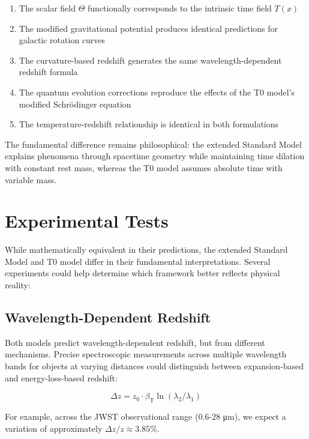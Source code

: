 \documentclass[aps,prl,twocolumn,superscriptaddress,nofootinbib]{revtex4-2}
\newcommand{\Tfield}{T(x)}
\newcommand{\betaT}{\beta_{\text{T}}}
\begin{document}
	\begin{enumerate}
		\item The scalar field $\Theta$ functionally corresponds to the intrinsic time field $\Tfield$
		\item The modified gravitational potential produces identical predictions for galactic rotation curves
		\item The curvature-based redshift generates the same wavelength-dependent redshift formula
		\item The quantum evolution corrections reproduce the effects of the T0 model's modified Schrödinger equation
		\item The temperature-redshift relationship is identical in both formulations
	\end{enumerate}
	
	The fundamental difference remains philosophical: the extended Standard Model explains phenomena through spacetime geometry while maintaining time dilation with constant rest mass, whereas the T0 model assumes absolute time with variable mass.
	
	\section{Experimental Tests}
	\label{sec:experiments}
	
	While mathematically equivalent in their predictions, the extended Standard Model and T0 model differ in their fundamental interpretations. Several experiments could help determine which framework better reflects physical reality:
	
	\subsection{Wavelength-Dependent Redshift}
	\label{subsec:redshift_tests}
	
	Both models predict wavelength-dependent redshift, but from different mechanisms. Precise spectroscopic measurements across multiple wavelength bands for objects at varying distances could distinguish between expansion-based and energy-loss-based redshift:
	
	\begin{equation}
		\Delta z = z_0 \cdot \betaT \ln(\lambda_2/\lambda_1)
		\label{eq:delta_z}
	\end{equation}
	
	For example, across the JWST observational range (0.6-28 \si{\micro\meter}), we expect a variation of approximately $\Delta z/z \approx 3.85\%$.
	
\end{document}
